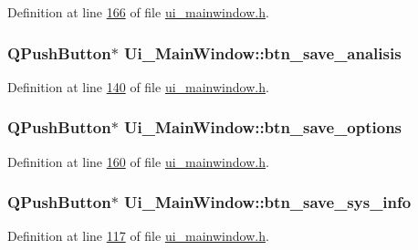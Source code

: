 Definition at line \hyperlink{a00052_source_l00166}{166} of file \hyperlink{a00052_source}{ui\+\_\+mainwindow.\+h}.

\hypertarget{a00027_a231adeaeca96ac21170495bfb1422e5e}{
\subsubsection[{btn\+\_\+save\+\_\+analisis}]{\setlength{\rightskip}{0pt plus 5cm}Q\+Push\+Button$\ast$ Ui\+\_\+\+Main\+Window\+::btn\+\_\+save\+\_\+analisis}}\label{a00027_a231adeaeca96ac21170495bfb1422e5e}


Definition at line \hyperlink{a00052_source_l00140}{140} of file \hyperlink{a00052_source}{ui\+\_\+mainwindow.\+h}.

\hypertarget{a00027_a409e5b794dbab22d7b958be406b6a030}{
\subsubsection[{btn\+\_\+save\+\_\+options}]{\setlength{\rightskip}{0pt plus 5cm}Q\+Push\+Button$\ast$ Ui\+\_\+\+Main\+Window\+::btn\+\_\+save\+\_\+options}}\label{a00027_a409e5b794dbab22d7b958be406b6a030}


Definition at line \hyperlink{a00052_source_l00160}{160} of file \hyperlink{a00052_source}{ui\+\_\+mainwindow.\+h}.

\hypertarget{a00027_a5ccef61fb3372e70d59a662f4fde5db3}{
\subsubsection[{btn\+\_\+save\+\_\+sys\+\_\+info}]{\setlength{\rightskip}{0pt plus 5cm}Q\+Push\+Button$\ast$ Ui\+\_\+\+Main\+Window\+::btn\+\_\+save\+\_\+sys\+\_\+info}}\label{a00027_a5ccef61fb3372e70d59a662f4fde5db3}


Definition at line \hyperlink{a00052_source_l00117}{117} of file \hyperlink{a00052_source}{ui\+\_\+mainwindow.\+h}.


